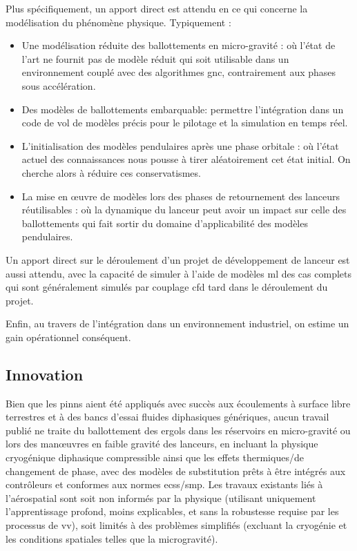 \documentclass[12pt]{article}
\begin{document}
	Plus spécifiquement, un apport direct est attendu en ce qui concerne la modélisation du phénomène physique. Typiquement :
	\begin{itemize}
		\item Une modélisation réduite des ballottements en micro-gravité : où l'état de l'art ne fournit pas de modèle réduit qui soit utilisable dans un environnement couplé avec des algorithmes \acrshort{gnc}, contrairement aux phases sous accélération.
		\item Des modèles de ballottements embarquable: permettre l'intégration dans un code de vol de modèles précis pour le pilotage et la simulation en temps réel.
		\item L'initialisation des modèles pendulaires après une phase orbitale : où l'état actuel des connaissances nous pousse à tirer aléatoirement cet état initial. On cherche alors à réduire ces conservatismes.
		\item La mise en œuvre de modèles lors des phases de retournement des lanceurs réutilisables : où la dynamique du lanceur peut avoir un impact sur celle des ballottements qui fait sortir du domaine d'applicabilité des modèles pendulaires.
	\end{itemize}
	Un apport direct sur le déroulement d'un projet de développement de lanceur est aussi attendu, avec la capacité de simuler à l'aide de modèles \acrshort{ml} des cas complets qui sont généralement simulés par couplage \acrshort{cfd} tard dans le déroulement du projet.
	
	Enfin, au travers de l'intégration dans un environnement industriel, on estime un gain opérationnel conséquent.
	
	\subsection*{Innovation}
	
	Bien que les \glspl{pinn} aient été appliqués avec succès aux écoulements à surface libre terrestres et à des bancs d’essai fluides diphasiques génériques, aucun travail publié ne traite du ballottement des ergols dans les réservoirs en micro-gravité ou lors des manœuvres en faible gravité des lanceurs, en incluant la physique cryogénique diphasique compressible ainsi que les effets thermiques/de changement de phase, avec des modèles de substitution prêts à être intégrés aux contrôleurs et conformes aux normes \acrshort{ecss}/\acrshort{smp}.
	Les travaux existants liés à l’aérospatial sont soit non informés par la physique (utilisant uniquement l’apprentissage profond, moins explicables, et sans la robustesse requise par les processus de \acrshort{vv}), soit limités à des problèmes simplifiés (excluant la cryogénie et les conditions spatiales telles que la microgravité).
	
\end{document}
